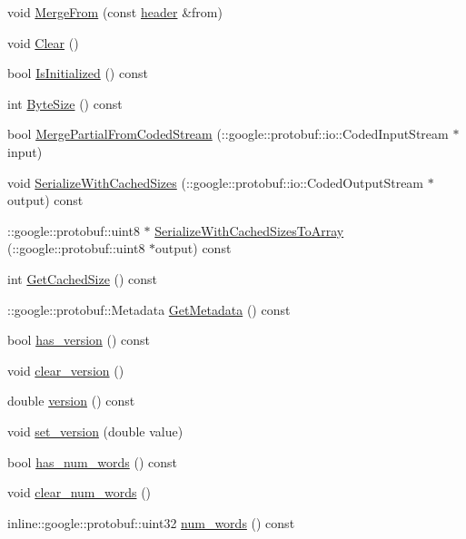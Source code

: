 \begin{DoxyCompactItemize}
\item 
void \hyperlink{class_l_d_a_1_1header_a2bf1c4d7b0ce37755af012923d121702}{MergeFrom} (const \hyperlink{class_l_d_a_1_1header}{header} \&from)
\item 
void \hyperlink{class_l_d_a_1_1header_a1b9b77bd3587d9ea67504e627ff9a2d7}{Clear} ()
\item 
bool \hyperlink{class_l_d_a_1_1header_aa5306ee3c56f17f9acc062d15a80ddbb}{IsInitialized} () const 
\item 
int \hyperlink{class_l_d_a_1_1header_a75db3ae5495fa84b189da5d7fe633f29}{ByteSize} () const 
\item 
bool \hyperlink{class_l_d_a_1_1header_aa1c4bd4d4ebf101f3dab2c0c3e68c1e6}{MergePartialFromCodedStream} (::google::protobuf::io::CodedInputStream $\ast$input)
\item 
void \hyperlink{class_l_d_a_1_1header_af3abc1d19ca9a72f227c15c435b34393}{SerializeWithCachedSizes} (::google::protobuf::io::CodedOutputStream $\ast$output) const 
\item 
::google::protobuf::uint8 $\ast$ \hyperlink{class_l_d_a_1_1header_a749a8161c81987cf66fa6f12fae54c1a}{SerializeWithCachedSizesToArray} (::google::protobuf::uint8 $\ast$output) const 
\item 
int \hyperlink{class_l_d_a_1_1header_a94543e30afd06f46e7d4a1d878630dda}{GetCachedSize} () const 
\item 
::google::protobuf::Metadata \hyperlink{class_l_d_a_1_1header_a6b19f3da9919a2fae6c1e19da47a0ff1}{GetMetadata} () const 
\item 
bool \hyperlink{class_l_d_a_1_1header_a0df1796a2011f0edab9bbf5235389c9d}{has\_\-version} () const 
\item 
void \hyperlink{class_l_d_a_1_1header_a650d9337806ae2b17519c035d90eecf6}{clear\_\-version} ()
\item 
double \hyperlink{class_l_d_a_1_1header_a97f32aac413592bd383b2ef20fac32f4}{version} () const 
\item 
void \hyperlink{class_l_d_a_1_1header_a14647f0be369f87ffd298ae0044fa213}{set\_\-version} (double value)
\item 
bool \hyperlink{class_l_d_a_1_1header_a4e5efbf319ae3c0b9dca161a90655d14}{has\_\-num\_\-words} () const 
\item 
void \hyperlink{class_l_d_a_1_1header_a5b0dbd43420ede8f188235acb21ab889}{clear\_\-num\_\-words} ()
\item 
inline::google::protobuf::uint32 \hyperlink{class_l_d_a_1_1header_ab77f21fa772258c8db0dc6511aae7a2a}{num\_\-words} () const 

\end{DoxyCompactItemize}
